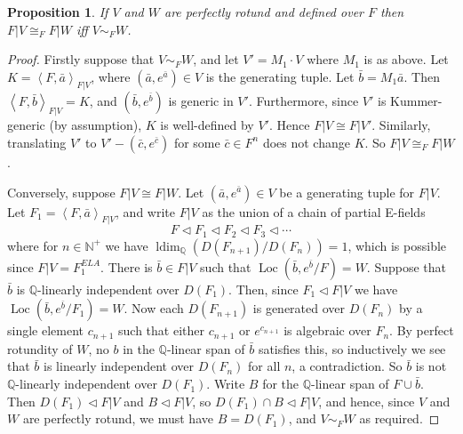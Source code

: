 \documentclass[12pt]{amsart}
\newtheorem{prop}{Proposition}[section]
\theoremstyle{definition}
\begin{document}
\begin{prop}
If $V$ and $W$ are perfectly rotund and defined over $F$ then $F|V {\cong}_F F|W$ iff $V \sim_F W$.
\end{prop}
\begin{proof}
Firstly suppose that $V \sim_F W$, and let $V' = M_1 \cdot V$ where $M_1$ is as above. Let $K = {\ensuremath{\left\langle {F,{{\ensuremath{\bar{a}}}}} \right\rangle}}_{F|V}$, where $({{\ensuremath{\bar{a}}}},e^{{\ensuremath{\bar{a}}}}) \in V$ is the generating tuple. Let ${{\ensuremath{\bar{b}}}} = M_1 {{\ensuremath{\bar{a}}}}$. Then ${\ensuremath{\left\langle {F,{{\ensuremath{\bar{b}}}}} \right\rangle}}_{F|V} = K$, and $({{\ensuremath{\bar{b}}}},e^{{\ensuremath{\bar{b}}}})$ is generic in $V'$. Furthermore, since $V'$ is Kummer-generic (by assumption), $K$ is well-defined by $V'$. Hence $F|V {\cong} F|V'$. Similarly, translating $V'$ to $V' - ({{\ensuremath{\bar{c}}}}, e^{{\ensuremath{\bar{c}}}})$ for some ${{\ensuremath{\bar{c}}}} \in F^n$ does not change $K$. So $F|V {\cong}_F F|W$.

Conversely, suppose $F|V {\cong} F|W$. Let $({{\ensuremath{\bar{a}}}},e^{{\ensuremath{\bar{a}}}}) \in V$ be a generating tuple for $F|V$. Let $F_1 = {\ensuremath{\left\langle {F,{{\ensuremath{\bar{a}}}}} \right\rangle}}_{F|V}$, and write $F|V$ as the union of a chain of partial E-fields
\[F {\ensuremath{\lhd}} F_1 {\ensuremath{\lhd}} F_2 {\ensuremath{\lhd}} F_3 {\ensuremath{\lhd}} \cdots \]
where for $n \in {\ensuremath{\mathbb{N}}}^+$ we have $\operatorname{ldim}_{\ensuremath{\mathbb{Q}}}(D(F_{n+1})/D(F_n)) = 1$, which is possible since $F|V = F_1^{ELA}$.
There is ${{\ensuremath{\bar{b}}}} \in F|V$ such that $\operatorname{Loc}({{\ensuremath{\bar{b}}}},e^{{\ensuremath{\bar{b}}}}/F) = W$. Suppose that ${{\ensuremath{\bar{b}}}}$ is  ${\ensuremath{\mathbb{Q}}}$-linearly independent over $D(F_1)$. Then, since $F_1 {\ensuremath{\lhd}} F|V$ we have $\operatorname{Loc}({{\ensuremath{\bar{b}}}},e^{{\ensuremath{\bar{b}}}}/F_1) = W$. Now each $D(F_{n+1})$ is generated over $D(F_n)$ by a single element $c_{n+1}$ such that either $c_{n+1}$ or $e^{c_{n+1}}$ is algebraic over $F_n$. By perfect rotundity of $W$, no $b$ in the ${\ensuremath{\mathbb{Q}}}$-linear span of ${{\ensuremath{\bar{b}}}}$ satisfies this, so inductively we see that ${{\ensuremath{\bar{b}}}}$ is linearly independent over $D(F_n)$ for all $n$, a contradiction. So ${{\ensuremath{\bar{b}}}}$ is not {\ensuremath{\mathbb{Q}}}-linearly independent over $D(F_1)$. Write $B$ for the ${\ensuremath{\mathbb{Q}}}$-linear span of $F \cup {{\ensuremath{\bar{b}}}}$. Then $D(F_1) {\ensuremath{\lhd}} F|V$ and $B {\ensuremath{\lhd}} F|V$, so $D(F_1) \cap B {\ensuremath{\lhd}} F|V$, and hence, since $V$ and $W$ are perfectly rotund, we must have $B = D(F_1)$, and $V \sim_F W$ as required.
\end{proof}
\end{document}
